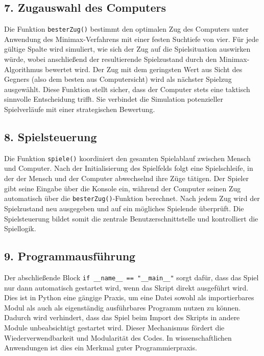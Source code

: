 \subsection*{7. Zugauswahl des Computers}

Die Funktion \texttt{besterZug()} bestimmt den optimalen Zug des Computers unter Anwendung des Minimax-Verfahrens mit einer festen Suchtiefe von vier. Für jede gültige Spalte wird simuliert, wie sich der Zug auf die Spielsituation auswirken würde, wobei anschließend der resultierende Spielzustand durch den Minimax-Algorithmus bewertet wird. Der Zug mit dem geringsten Wert aus Sicht des Gegners (also dem besten aus Computersicht) wird als nächster Spielzug ausgewählt. Diese Funktion stellt sicher, dass der Computer stets eine taktisch sinnvolle Entscheidung trifft. Sie verbindet die Simulation potenzieller Spielverläufe mit einer strategischen Bewertung.

\subsection*{8. Spielsteuerung}

Die Funktion \texttt{spiele()} koordiniert den gesamten Spielablauf zwischen Mensch und Computer. Nach der Initialisierung des Spielfelds folgt eine Spielschleife, in der der Mensch und der Computer abwechselnd ihre Züge tätigen. Der Spieler gibt seine Eingabe über die Konsole ein, während der Computer seinen Zug automatisch über die \texttt{besterZug()}-Funktion berechnet. Nach jedem Zug wird der Spielzustand neu ausgegeben und auf ein mögliches Spielende überprüft. Die Spielsteuerung bildet somit die zentrale Benutzerschnittstelle und kontrolliert die Spiellogik.

\subsection*{9. Programmausführung}

Der abschließende Block \texttt{if \_\_name\_\_ == "\_\_main\_\_"} sorgt dafür, dass das Spiel nur dann automatisch gestartet wird, wenn das Skript direkt ausgeführt wird. Dies ist in Python eine gängige Praxis, um eine Datei sowohl als importierbares Modul als auch als eigenständig ausführbares Programm nutzen zu können. Dadurch wird verhindert, dass das Spiel beim Import des Skripts in andere Module unbeabsichtigt gestartet wird. Dieser Mechanismus fördert die Wiederverwendbarkeit und Modularität des Codes. In wissenschaftlichen Anwendungen ist dies ein Merkmal guter Programmierpraxis.

